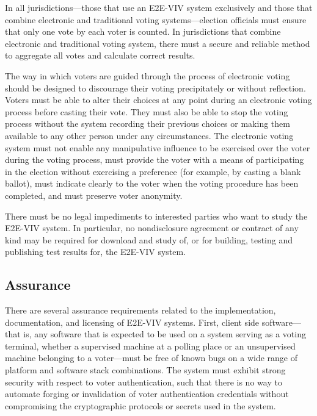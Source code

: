 In all jurisdictions---those that use an E2E-VIV system exclusively
and those that combine electronic and traditional voting
systems---election officials must ensure that only one vote by each
voter is counted. In jurisdictions that combine electronic and
traditional voting system, there must a secure and reliable method to
aggregate all votes and calculate correct results.

The way in which voters are guided through the process of electronic
voting should be designed to discourage their voting precipitately or
without reflection. Voters must be able to alter their choices at any
point during an electronic voting process before casting their
vote. They must also be able to stop the voting process without the
system recording their previous choices or making them available to
any other person under any circumstances. The electronic voting system
must not enable any manipulative influence to be exercised over the
voter during the voting process, must provide the voter with a means
of participating in the election without exercising a preference (for
example, by casting a blank ballot), must indicate clearly to the
voter when the voting procedure has been completed, and must preserve
voter anonymity.

There must be no legal impediments to interested parties who want to
study the E2E-VIV system. In particular, no nondisclosure agreement or
contract of any kind may be required for download and study of, or for
building, testing and publishing test results for, the E2E-VIV system.

\subsection{Assurance}

There are several assurance requirements related to the
implementation, documentation, and licensing of E2E-VIV
systems. First, client side software---that is, any software that is
expected to be used on a system serving as a voting terminal, whether
a supervised machine at a polling place or an unsupervised machine
belonging to a voter---must be free of known bugs on a wide range of
platform and software stack combinations. The system must exhibit
strong security with respect to voter authentication, such that there
is no way to automate forging or invalidation of voter authentication
credentials without compromising the cryptographic protocols or
secrets used in the system.

